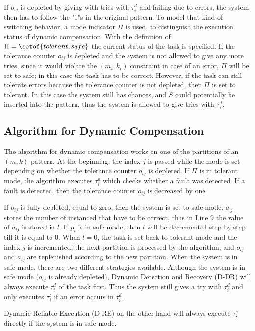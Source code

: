If $o_{ij}$ is depleted by giving with tries with $\tau_i^d$ and failing due to errors, the system then has to follow the "1"s in the original pattern. To model that kind of switching behavior, a mode indicator $\Pi$ is used, to distinguish the execution status of dynamic compensation. With the definition of $\Pi=\setof{tolerant, safe}$ the current status of the task is specified. If the tolerance counter $o_{ij}$ is depleted and the system is not allowed to give any more tries, since it would violate the $(m_i,k_i)$ constraint in case of an error, $\Pi$ will be set to safe; in this case the task has to be correct.  However, if the task can still tolerate errors because the tolerance counter is not depleted, then $\Pi$ is set to tolerant. In this case the system still has chances, and $S$ could potentially be inserted into the pattern, thus the system is allowed to give tries with $\tau_i^d$.

\subsection{Algorithm for Dynamic Compensation}
The algorithm for dynamic compensation works on one of the partitions of an $(m,k)$-pattern. At the beginning, the index $j$ is passed while the mode is set depending on whether the tolerance counter $o_{ij}$ is depleted. If $\Pi$ is in tolerant mode, the algorithm executes $\tau^d_i$ which checks whether a fault was detected. If a fault is detected, then the tolerance counter $o_{ij}$ is decreased by one.

If $o_{ij}$ is fully depleted, equal to zero, then the system is set to safe mode. $a_{ij}$ stores the number of instanced that have to be correct, thus in Line 9 the value of $a_{ij}$  is stored in $l$. 
If $p_i$ is in safe mode, then $l$ will be decremented step by step till  it is equal to 0. When $l=0$, the task is set back to tolerant mode and the index $j$ is incremented; the next partition is processed by the algorithm, and $o_{ij}$ and $a_{ij}$ are replenished according to the new partition.
When the system is in safe mode, there are two different strategies available. Although the system is in safe mode ($o_{ij}$ is already depleted), Dynamic Detection and Recovery (D-DR) will always execute $\tau_i^d$ of the task first. Thus the system still gives a try with $\tau_i^d$ and only executes $\tau_i^c$ if an error occurs in $\tau_i^d$. 

Dynamic Reliable Execution (D-RE) on the other hand will always execute $\tau_i^c$ directly if the system is in safe mode.

